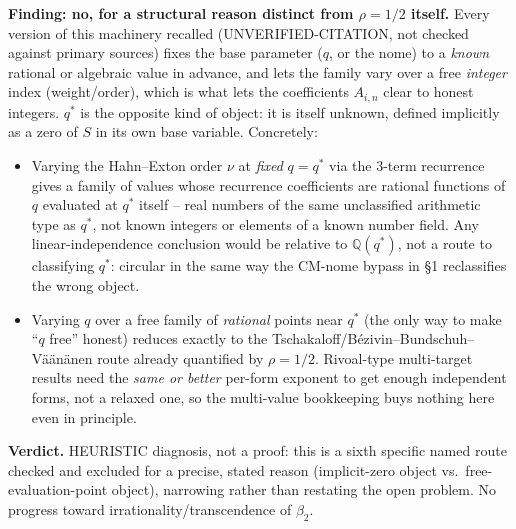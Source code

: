 \documentclass[11pt]{article}
\begin{document}
\textbf{Finding: no, for a structural reason distinct from $\rho=1/2$ itself.} Every version of
this machinery recalled (UNVERIFIED-CITATION, not checked against primary sources) fixes the base
parameter ($q$, or the nome) to a \emph{known} rational or algebraic value in advance, and lets the
family vary over a free \emph{integer} index (weight/order), which is what lets the coefficients
$A_{i,n}$ clear to honest integers. $q^\ast$ is the opposite kind of object: it is itself unknown,
defined implicitly as a zero of $S$ in its own base variable. Concretely:
\begin{itemize}
\item Varying the Hahn--Exton order $\nu$ at \emph{fixed} $q=q^\ast$ via the 3-term recurrence
gives a family of values whose recurrence coefficients are rational functions of $q$ evaluated at
$q^\ast$ itself -- real numbers of the same unclassified arithmetic type as $q^\ast$, not known
integers or elements of a known number field. Any linear-independence conclusion would be relative
to $\mathbb{Q}(q^\ast)$, not a route to classifying $q^\ast$: circular in the same way the CM-nome
bypass in \S1 reclassifies the wrong object.
\item Varying $q$ over a free family of \emph{rational} points near $q^\ast$ (the only way to make
``$q$ free'' honest) reduces exactly to the Tschakaloff/B\'ezivin--Bundschuh--V\"a\"an\"anen
route already quantified by $\rho=1/2$. Rivoal-type multi-target results need the \emph{same or
better} per-form exponent to get enough independent forms, not a relaxed one, so the multi-value
bookkeeping buys nothing here even in principle.
\end{itemize}

\textbf{Verdict.} HEURISTIC diagnosis, not a proof: this is a sixth specific named route checked
and excluded for a precise, stated reason (implicit-zero object vs.\ free-evaluation-point object),
narrowing rather than restating the open problem. No progress toward irrationality/transcendence of
$\beta_2$.
\end{document}
